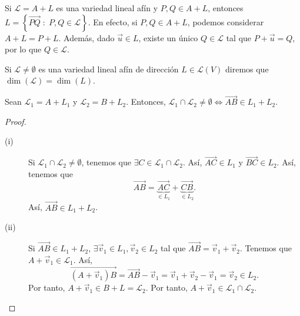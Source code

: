 \begin{observation}
	\normalfont Si $\displaystyle \mathcal{L} = A + L $ es una variedad lineal afín y $\displaystyle P,Q \in A + L $, entonces $\displaystyle L = \left\{ \overrightarrow{PQ} \; : \; P,Q \in \mathcal{L}\right\}  $. En efecto, si $\displaystyle P,Q \in A + L $, podemos considerar $\displaystyle A + L = P + L $. Además, dado $\displaystyle \vec{u} \in L $, existe un único $\displaystyle Q \in \mathcal{L} $ tal que $\displaystyle P + \vec{u} = Q $, por lo que $\displaystyle Q \in \mathcal{L} $.  
\end{observation}
\begin{fdefinition}
\normalfont Si $\displaystyle \mathcal{L} \neq \emptyset $ es una variedad lineal afín de dirección $\displaystyle L \in \mathcal{L}\left(V\right) $ diremos que $\displaystyle \dim\left(\mathcal{L}\right) = \dim\left(L\right) $.
\end{fdefinition}
\begin{ftheorem}[]
	\normalfont Sean $\displaystyle \mathcal{L}_{1} = A + L_{1} $ y $\displaystyle \mathcal{L}_{2} = B + L_{2} $. Entonces, $\displaystyle \mathcal{L}_{1} \cap \mathcal{L}_{2} \neq \emptyset \iff \overrightarrow{AB} \in L_{1} + L_{2}$.
\end{ftheorem}
\begin{proof}
\begin{description}
	\item[(i)] Si $\displaystyle \mathcal{L}_{1} \cap \mathcal{L}_{2} \neq \emptyset $, tenemos que $\displaystyle \exists C \in \mathcal{L}_{1} \cap \mathcal{L}_{2} $. Así, $\displaystyle \overrightarrow{AC} \in L_{1} $ y $\displaystyle \overrightarrow{BC} \in L_{2} $. Así, tenemos que 
		\[\overrightarrow{AB} = \underbrace{\overrightarrow{AC}}_{\in L_{1}} + \underbrace{\overrightarrow{CB}}_{\in L_{2}} .\]
		Así, $\displaystyle \overrightarrow{AB} \in L_{1} + L_{2} $.
	\item[(ii)] Si $\displaystyle \overrightarrow{AB} \in L_{1} + L_{2} $, $\displaystyle \exists \vec{v}_{1} \in L_{1}, \vec{v}_{2} \in L_{2} $ tal que $\displaystyle \overrightarrow{AB} = \vec{v}_{1} +\vec{v}_{2} $. Tenemos que $\displaystyle A + \vec{v}_{1} \in \mathcal{L}_{1} $. Así,
		\[ \overrightarrow{\left(A + \vec{v}_{1}\right)B} = \overrightarrow{AB} - \vec{v}_{1} = \vec{v}_{1} +\vec{v}_{2} -\vec{v}_{1} = \vec{v}_{2} \in L_{2} .\]
		Por tanto, $\displaystyle A + \vec{v}_{1} \in B + L = \mathcal{L}_{2}$. Por tanto, $\displaystyle A + \vec{v}_{1} \in \mathcal{L}_{1} \cap \mathcal{L}_{2} $.
\end{description}
\end{proof}

